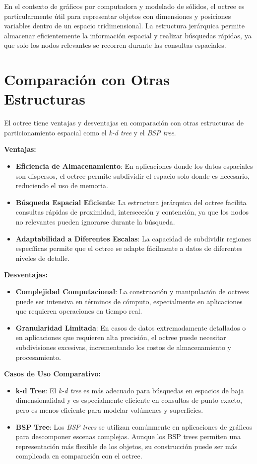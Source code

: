 \documentclass{article}
\begin{document}
En el contexto de gráficos por computadora y modelado de sólidos, el octree es particularmente útil para representar objetos con dimensiones y posiciones variables dentro de un espacio tridimensional. La estructura jerárquica permite almacenar eficientemente la información espacial y realizar búsquedas rápidas, ya que solo los nodos relevantes se recorren durante las consultas espaciales.

\section{Comparación con Otras Estructuras}
El octree tiene ventajas y desventajas en comparación con otras estructuras de particionamiento espacial como el \textit{k-d tree} y el \textit{BSP tree}.

\textbf{Ventajas:} 
\begin{itemize}
    \item \textbf{Eficiencia de Almacenamiento}: En aplicaciones donde los datos espaciales son dispersos, el octree permite subdividir el espacio solo donde es necesario, reduciendo el uso de memoria.
    \item \textbf{Búsqueda Espacial Eficiente}: La estructura jerárquica del octree facilita consultas rápidas de proximidad, intersección y contención, ya que los nodos no relevantes pueden ignorarse durante la búsqueda.
    \item \textbf{Adaptabilidad a Diferentes Escalas}: La capacidad de subdividir regiones específicas permite que el octree se adapte fácilmente a datos de diferentes niveles de detalle.
\end{itemize}

\textbf{Desventajas:}
\begin{itemize}
    \item \textbf{Complejidad Computacional}: La construcción y manipulación de octrees puede ser intensiva en términos de cómputo, especialmente en aplicaciones que requieren operaciones en tiempo real.
    \item \textbf{Granularidad Limitada}: En casos de datos extremadamente detallados o en aplicaciones que requieren alta precisión, el octree puede necesitar subdivisiones excesivas, incrementando los costos de almacenamiento y procesamiento.
\end{itemize}

\textbf{Casos de Uso Comparativo:}
\begin{itemize}
    \item \textbf{k-d Tree}: El \textit{k-d tree} es más adecuado para búsquedas en espacios de baja dimensionalidad y es especialmente eficiente en consultas de punto exacto, pero es menos eficiente para modelar volúmenes y superficies.
    \item \textbf{BSP Tree}: Los \textit{BSP trees} se utilizan comúnmente en aplicaciones de gráficos para descomponer escenas complejas. Aunque los BSP trees permiten una representación más flexible de los objetos, su construcción puede ser más complicada en comparación con el octree.
\end{itemize}
\end{document}
